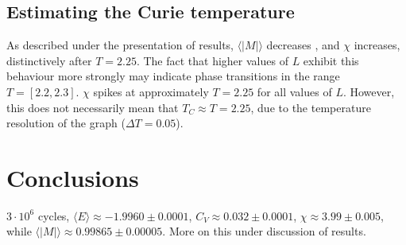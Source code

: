 \documentclass[%
oneside,                 %
final,                   %
10pt]{article}
\begin{document}
\subsection{Estimating the Curie temperature}
As described under the presentation of results, $\langle |M| \rangle$ decreases , and $\chi$ increases, distinctively after $T=2.25$.  The fact that higher values of $L$ exhibit this behaviour more strongly may indicate phase transitions in the range $T=[2.2,2.3]$. $\chi$ spikes at approximately $T=2.25$ for all values of $L$. However, this does not necessarily mean that $T_C\approx T=2.25$, due to the temperature resolution of the graph ($\Delta T=0.05$).



\section{Conclusions}
$3 \cdot 10^6$ cycles, $\langle E \rangle \approx -1.9960 \pm 0.0001$, $C_V \approx 0.032 \pm 0.0001$, $\chi \approx 3.99 \pm 0.005$, while $\langle |M| \rangle \approx 0.99865 \pm 0.00005$. More on this under discussion of results. 



\end{document}
